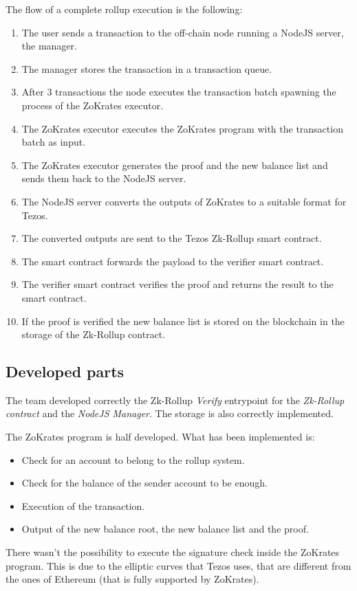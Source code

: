 The flow of a complete rollup execution is the following:
\begin{enumerate}
    \item The user sends a transaction to the off-chain node running a NodeJS server, the manager.
    \item The manager stores the transaction in a transaction queue.
    \item After 3 transactions the node executes the transaction batch spawning the process of the ZoKrates executor.
    \item The ZoKrates executor executes the ZoKrates program with the transaction batch as input.
    \item The ZoKrates executor generates the proof and the new balance list and sends them back to the NodeJS server.
    \item The NodeJS server converts the outputs of ZoKrates to a suitable format for Tezos.
    \item The converted outputs are sent to the Tezos Zk-Rollup smart contract.
    \item The smart contract forwards the payload to the verifier smart contract.
    \item The verifier smart contract verifies the proof and returns the result to the smart contract.
    \item If the proof is verified the new balance list is stored on the blockchain in the storage of the Zk-Rollup contract.
\end{enumerate}

\subsection{Developed parts}
The team developed correctly the Zk-Rollup \textit{Verify} entrypoint for the \textit{Zk-Rollup contract} and the \textit{NodeJS Manager}. The storage is also correctly implemented.

The ZoKrates program is half developed. What has been implemented is:
\begin{itemize}
    \item Check for an account to belong to the rollup system.
    \item Check for the balance of the sender account to be enough.
    \item Execution of the transaction.
    \item Output of the new balance root, the new balance list and the proof.
\end{itemize}
There wasn't the possibility to execute the signature check inside the ZoKrates program. This is due to the elliptic curves that Tezos uses, that are different from the ones of Ethereum (that is fully supported by ZoKrates).

